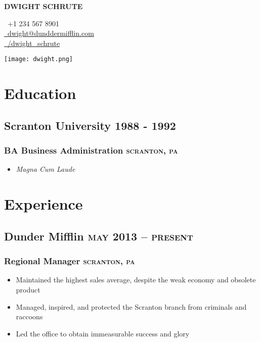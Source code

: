 \documentclass{article}
\newcommand{\rside}[1]{\hfill \normalfont\scshape\MakeLowercase{#1}}
\begin{document}
\begin{center}
  \begin{minipage}{0.45\textwidth}
    {\Huge\bfseries DWIGHT SCHRUTE}
  \end{minipage}\hfill
  \begin{minipage}{0.3\textwidth}
    \faPhone\ +1 234 567 8901 \\
    \href{mailto:abc@def.xyz}{\faEnvelope\ dwight@dunddermifflin.com} \\
    \href{https://linkedin.com}{\faLinkedin\ /dwight\_schrute}
  \end{minipage}
  \begin{minipage}{0.2\textwidth}
    \texttt{[image: dwight.png]}
  \end{minipage}
\end{center}

\section{\faGraduationCap\enspace Education}
\subsection{Scranton University \rside{1988 - 1992}}
\subsubsection{BA Business Administration \rside{Scranton, PA}}
\begin{itemize}
  \item \textit{Magna Cum Laude}
\end{itemize}

\section{\faChartPie\enspace Experience}
\subsection{Dunder Mifflin \rside{May 2013 -- Present}}
\subsubsection{Regional Manager \rside{Scranton, PA}}
\begin{itemize}
  \item Maintained the highest sales average, despite the weak economy and obsolete product
  \item Managed, inspired, and protected the Scranton branch from criminals and raccoons
  \item Led the office to obtain immeasurable success and glory
\end{itemize}
\end{document}
